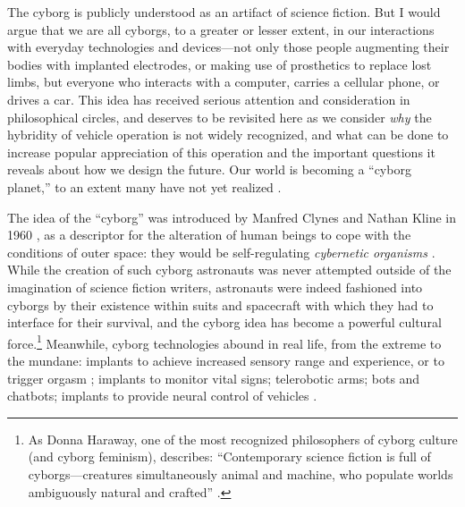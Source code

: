 The cyborg is publicly understood as an artifact of science
fiction. But I would argue that we are
all cyborgs, to a greater or lesser extent, in our interactions with
everyday technologies and devices---not only those people augmenting
their bodies with implanted electrodes, or making use of prosthetics
to replace lost limbs, but everyone who interacts with a computer,
carries a cellular phone, or drives a car. This idea has received
serious attention and consideration in philosophical circles, and
deserves to be revisited here as we consider \emph{why} the hybridity
of vehicle operation is not widely recognized, and what can be done to
increase popular appreciation of this operation and the important
questions it reveals about how we design the future. Our world is
becoming a ``cyborg planet,'' to an extent many have not yet
realized \cite[p. 64]{ekbia}.

The idea of the ``cyborg'' was introduced by Manfred Clynes and Nathan
Kline in 1960 \cite{clyneskline}, as a descriptor for the alteration
of human beings to 
cope with the conditions of outer space: they would be self-regulating
\emph{cybernetic organisms} \cite[p. 66]{ekbia}. While the creation of
such cyborg astronauts was never attempted outside of the imagination
of science fiction writers, astronauts were indeed fashioned into
cyborgs by their existence within suits and spacecraft with which they
had to interface for their survival, and the cyborg idea has become a
powerful cultural force.\footnote{As Donna Haraway, one of the most recognized
philosophers of cyborg culture (and cyborg feminism), describes:
``Contemporary science 
fiction is full of cyborgs---creatures simultaneously
animal and machine, who populate worlds ambiguously natural and
crafted'' \cite[p. 117]{haraway}.} Meanwhile, cyborg technologies
abound in real life, from the extreme to the mundane: implants to
achieve increased sensory range and experience, or to trigger orgasm
\cite[p. 64]{ekbia}; implants to monitor vital signs; telerobotic
arms; bots and chatbots; implants to provide neural control of
vehicles \cite[p. 65]{ekbia}. 


